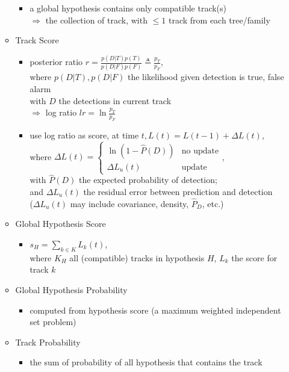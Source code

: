 \begin{itemize}
\begin{itemize}
		\begin{itemize}
		\item a global hypothesis contains only compatible track(s) \\ 
		$\Rightarrow$ the collection of track, with $\le1$ track from each tree/family
		\end{itemize}
	\item Track Score
		\begin{itemize}
		\item posterior ratio $r=\frac{p(D|T)p(T)}{p(D|F)p(F)}\triangleq \frac{p_T}{p_F}$, \\
		where $p(D|T), p(D|F)$ the likelihood given detection is true, false alarm \\
		with $D$ the detections in current track \\
		$\Rightarrow$ log ratio $lr = \ln \frac{p_T}{p_F}$
		\item use log ratio as score, at time $t, L(t) = L(t-1) + \Delta L(t)$, \\
		where $\Delta L(t) = \begin{cases} \ln(1-\hat{P}(D)) & \text{no update} \\ \Delta L_u(t) & \text{update} \end{cases}$, \\
		with $\hat{P}(D)$ the expected probability of detection; \\ 
		and $\Delta L_u(t)$ the residual error between prediction and detection \\
		($\Delta L_u(t)$ may include covariance, density, $\hat P_D$, etc.)
		\end{itemize}
	\item Global Hypothesis Score
		\begin{itemize}
		\item $s_H = \sum_{k\in K} L_k(t)$, \\ 
		where $K_H$ all (compatible) tracks in hypothesis $H$, $L_k$ the score for track $k$
		\end{itemize}
	\item Global Hypothesis Probability
		\begin{itemize}
		\item computed from hypothesis score (a maximum weighted independent set problem)
		\end{itemize}
	\item Track Probability
		\begin{itemize}
		\item the sum of probability of all hypothesis that contains the track

\end{itemize}
\end{itemize}
\end{itemize}
